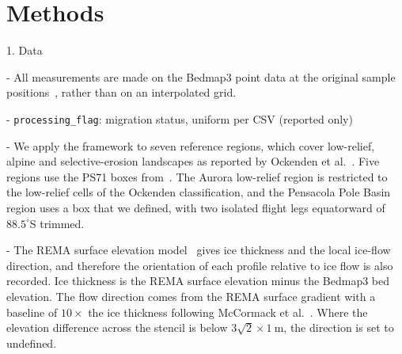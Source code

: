\chapter{Methods}\label{methods}

 1. Data




  - All measurements are made on the Bedmap3 point data at the original sample positions~\cite{Pritchard_2025}, rather than on an interpolated grid. 

  - \texttt{processing\_flag}: migration status, uniform per CSV (reported only)
  	
  - We apply the framework to seven reference regions, which cover low-relief, alpine and selective-erosion landscapes as reported by Ockenden et al.~\cite{Ockenden_2026}. Five
  regions use the PS71 boxes from~\cite{Ockenden_2025_data}. The Aurora low-relief region is restricted to the low-relief cells of the Ockenden classification, and the Pensacola Pole
  Basin region uses a box that we defined, with two isolated flight legs equatorward of $88.5^\circ$S trimmed. 

  - The REMA surface elevation model~\cite{REMA} gives ice thickness and the local ice-flow direction, and therefore the orientation of each profile relative to ice flow is also recorded. Ice thickness is the REMA surface elevation minus the Bedmap3 bed elevation. The flow direction comes from the REMA surface gradient with a baseline of $10\times$ the ice thickness following McCormack et al.~\cite{McCormack_2019}. Where the elevation difference across the stencil is below $3\sqrt{2} \times 1~\mathrm{m}$, the direction is set to undefined.


